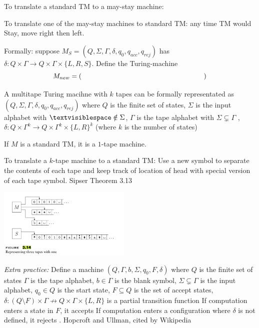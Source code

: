 \documentclass[12pt, oneside]{article}
\begin{document}
To translate a standard TM to a may-stay machine: 

\vspace{100pt}




To translate one  of the  may-stay machines to standard TM:
any time TM would Stay, move right  then  left.


Formally: suppose $M_S =  (Q, \Sigma, \Gamma, \delta, q_0, q_{acc}, q_{rej})$
has $\delta: Q \times \Gamma \to Q \times \Gamma \times \{L, R, S\}$. Define
the Turing-machine
\[
  M_{new} =  (\phantom{\hspace{2.5in}})
\]

\vfill

\newpage

\vfill


 A multitape Turing macihne with $k$ tapes
can be formally representated as 
$(Q, \Sigma,  \Gamma, \delta, q_0, q_{acc}, q_{rej})$ 
where $Q$ is the finite set of  states,
$\Sigma$ is the  input alphabet with  $\textvisiblespace \notin \Sigma$,
$\Gamma$  is the  tape alphabet with $\Sigma \subsetneq \Gamma$ ,
$\delta: Q\times \Gamma^k\to Q \times \Gamma^k \times \{L,R\}^k$ 
(where $k$ is  the number of  states)


If $M$ is a standard  TM, it is a $1$-tape machine.


To translate a $k$-tape machine  to  a standard TM:
Use a  new symbol to separate the contents of each tape
and keep track of location of  head with  special version of each
tape symbol. {\tiny Sipser Theorem 3.13} 

\includegraphics[width=2.5in]{../../resources/images/Figure314.png}


{\it Extra practice:} 
Define a machine $(Q, \Gamma, b, \Sigma,  q_0, F, \delta)$
where $Q$ is the finite set  of  states
$\Gamma$  is the tape alphabet,
$b \in \Gamma$ is the blank symbol, 
$\Sigma \subsetneq \Gamma$ is the  input alphabet, 
$q_0 \in  Q$ is the start state, 
$F \subseteq Q$ is the set of accept states, 
$\delta: (Q \setminus F)  \times  \Gamma \not\to Q \times  \Gamma  \times \{L, R\}$
 is a partial transition function
If computation enters a state  in $F$, it  accepts 
If computation enters a configuration where
 $\delta$ is not defined, it  rejects . {\tiny Hopcroft and  Ullman, cited by  Wikipedia} 
\end{document}

